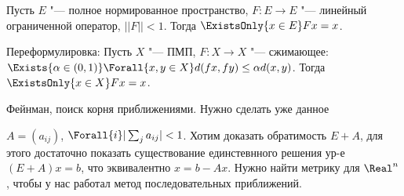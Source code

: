 \begin{theorem}[1922 Банах]
  Пусть $E$ "--- полное нормированное пространство, $F : E \to E$ "---
  линейный ограниченной оператор, $||F|| < 1$. Тогда
  $\ExistsOnly{x \in E} Fx = x$.
\end{theorem}

Переформулировка:
Пусть $X$ "--- ПМП, $F : X \to X$ "--- сжимающее:
$\Exists{\alpha \in (0, 1)} \Forall{x, y \in X}
d(fx, fy) \le \alpha d(x, y)$. Тогда
$\ExistsOnly{x \in X} Fx = x$.

Фейнман, поиск корня приближениями.
Нужно сделать уже данное 

\begin{problem}
  $A = (a_{ij})$, $\Forall{i} |\sum_{j} a_{ij}| < 1$.
  Хотим доказать обратимость $E + A$,
  для этого достаточно показать существование единстевнного
  решения ур-е $(E + A) x = b$, что эквивалентно
  $x = b - A x$. Нужно найти метрику для $\Real^n$,
  чтобы у нас работал метод последовательных приближений.
\end{problem}


